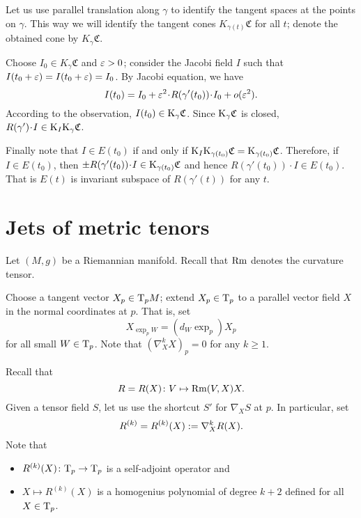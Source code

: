 \documentclass[a4paper,10pt]{article}
\begin{document}
Let us use parallel translation along $\gamma$ to identify the tangent spaces at the points on $\gamma$.
This way we will identify the tangent cones $K_{\gamma(t)}\mathfrak{C}$ for all $t$;
denote the obtained cone by $K_\gamma\mathfrak{C}$.

Choose $I_0\in K_\gamma\mathfrak{C}$ and $\varepsilon>0$;
consider the Jacobi field $I$ such that $I(t_0+\eps)\z=I(t_0+\eps)=I_0$.
By Jacobi equation, we have
\[I(t_0)=I_0+\eps^2\cdot R(\gamma'(t_0))\cdot I_0+o(\eps^2).\]
According to the observation, $I(t_0)\in \mathrm{K}_{\gamma} \mathfrak{C}$.
Since $\mathrm{K}_{\gamma} \mathfrak{C}$ is closed, $R(\gamma')\cdot I\z\in \K_I\K_\gamma\mathfrak{C}$.

Finally note that $I\in E(t_0)$ if and only if $\mathrm{K}_I\mathrm{K}_{\gamma(t_0)}\mathfrak{C}=\mathrm{K}_{\gamma(t_0)}\mathfrak{C}$.
Therefore, if $I\in E(t_0)$, then $\pm R(\gamma'(t_0))\cdot I\in \K_{\gamma(t_0)}\mathfrak{C}$ and hence $R(\gamma'(t_0))\cdot I\in E(t_0)$.
That is $E(t)$ is invariant subspace of $ R(\gamma'(t))$ for any $t$.
\qeds
  
\section{Jets of metric tenors}\label{sec:jet}

Let $(M,g)$ be a Riemannian manifold.
Recall that $\operatorname{Rm}$ denotes the curvature tensor.

Choose a tangent vector $X_p\in \mathrm{T}_pM$; 
extend $X_p\in \mathrm{T}_p$ to a parallel vector field $X$ in the normal coordinates at $p$.
That is, set 
\[X_{\exp_pW}=(d_W\exp_p)X_p\] for all small $W\in \mathrm{T}_p$.
Note that $(\nabla^k_X X)_p=0$ for any $k\ge 1$.

Recall that 
\[R=R(X)\colon V\mapsto \operatorname{Rm}(V,X)X.\]
Given a tensor field $S$, let us use the shortcut $S'$  for $\nabla_XS$ at $p$.
In particular, set
\[R^{(k)}=R^{(k)}(X)\mathrel{{:}{=}}\nabla^k_XR(X).\]
Note that 
\begin{itemize}
\item $R^{(k)}(X)\colon\mathrm{T}_p\to\mathrm{T}_p$ is a self-adjoint operator and
\item $X\mapsto R^{(k)}(X)$ is a homogenius polynomial of degree $k+2$ defined for all $X\in \mathrm{T}_p$.
\end{itemize}

 
\end{document}

